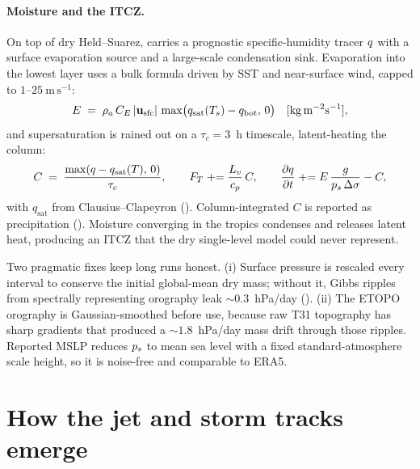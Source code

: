 \paragraph{Moisture and the ITCZ.} On top of dry Held--Suarez, \model{} carries a
prognostic specific-humidity tracer $q$ with a surface evaporation source and a
large-scale condensation sink. Evaporation into the lowest layer uses a bulk
formula driven by SST and near-surface wind, capped to $1$--$25\ \mathrm{m\,s^{-1}}$:
\begin{equation}
  E \;=\; \rho_a\,C_E\,|\mathbf{u}_{\mathrm{sfc}}|\,\max\!\big(q_{\mathrm{sat}}(T_s) - q_{\mathrm{bot}},\,0\big)
  \quad[\mathrm{kg\,m^{-2}s^{-1}}],
\end{equation}
and supersaturation is rained out on a $\tau_c = 3$~h timescale, latent-heating the
column:
\begin{equation}
  C \;=\; \frac{\max(q - q_{\mathrm{sat}}(T),\,0)}{\tau_c},
  \qquad
  F_T \mathrel{+}= \frac{L_v}{c_p}\,C,
  \qquad
  \frac{\partial q}{\partial t} \mathrel{+}= E\,\frac{g}{p_s\,\Delta\sigma} - C,
\end{equation}
with $q_{\mathrm{sat}}$ from Clausius--Clapeyron
(). Column-integrated $C$ is reported as precipitation
(). Moisture
converging in the tropics condenses and releases latent heat, producing an ITCZ
that the dry single-level model could never represent.

\begin{remark}
Two pragmatic fixes keep long runs honest. (i) Surface pressure is rescaled every
interval to conserve the initial global-mean dry mass; without it, Gibbs ripples
from spectrally representing orography leak $\sim 0.3$~hPa/day
(). (ii) The ETOPO
orography is Gaussian-smoothed before use, because raw T31 topography has sharp
gradients that produced a $\sim 1.8$~hPa/day mass drift through those ripples.
Reported MSLP reduces $p_s$ to mean sea level with a fixed standard-atmosphere
scale height, so it is noise-free and comparable to ERA5.
\end{remark}

\section{How the jet and storm tracks emerge}\label{sec:ch09eddies}

